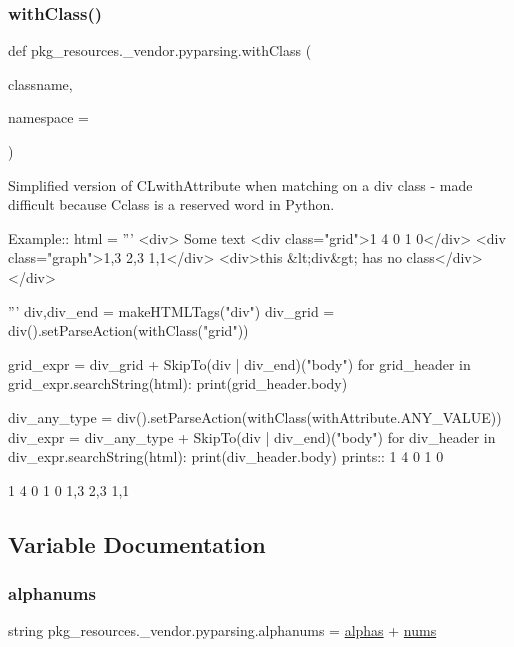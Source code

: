 \subsubsection{\texorpdfstring{with\+Class()}{withClass()}}
{\footnotesize\ttfamily def pkg\+\_\+resources.\+\_\+vendor.\+pyparsing.\+with\+Class (\begin{DoxyParamCaption}\item[{}]{classname,  }\item[{}]{namespace = {\ttfamily \textquotesingle{}\textquotesingle{}} }\end{DoxyParamCaption})}

\begin{DoxyVerb}Simplified version of C{L{withAttribute}} when matching on a div class - made
difficult because C{class} is a reserved word in Python.

Example::
    html = '''
        <div>
        Some text
        <div class="grid">1 4 0 1 0</div>
        <div class="graph">1,3 2,3 1,1</div>
        <div>this &lt;div&gt; has no class</div>
        </div>
            
    '''
    div,div_end = makeHTMLTags("div")
    div_grid = div().setParseAction(withClass("grid"))
    
    grid_expr = div_grid + SkipTo(div | div_end)("body")
    for grid_header in grid_expr.searchString(html):
        print(grid_header.body)
    
    div_any_type = div().setParseAction(withClass(withAttribute.ANY_VALUE))
    div_expr = div_any_type + SkipTo(div | div_end)("body")
    for div_header in div_expr.searchString(html):
        print(div_header.body)
prints::
    1 4 0 1 0

    1 4 0 1 0
    1,3 2,3 1,1
\end{DoxyVerb}
 

\subsection{Variable Documentation}
\mbox{\label{namespacepkg__resources_1_1__vendor_1_1pyparsing_abd10420c9a41c54b82b281181e0ed109}} 
\subsubsection{\texorpdfstring{alphanums}{alphanums}}
{\footnotesize\ttfamily string pkg\+\_\+resources.\+\_\+vendor.\+pyparsing.\+alphanums = \hyperlink{namespacepkg__resources_1_1__vendor_1_1pyparsing_a20ad4ed375fe5fc1570c40151eb9cbc5}{alphas} + \hyperlink{namespacepkg__resources_1_1__vendor_1_1pyparsing_a6c6517120cc6c9ef6818a9fc8ec194a2}{nums}}

